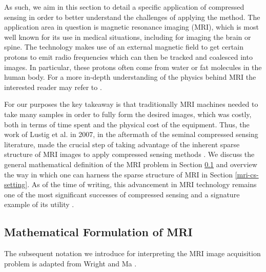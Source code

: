 \documentclass[12pt,a4paper]{amsart}
\numberwithin{equation}{section}
\theoremstyle{plain}
\theoremstyle{definition}
\begin{document}
As such, we aim in this section to detail a specific application of compressed sensing in order to better understand the challenges of applying the method. The application area in question is magnetic resonance imaging (MRI), which is most well known for its use in medical situations, including for imaging the brain or spine. The technology makes use of an external magnetic field to get certain protons to emit radio frequencies which can then be tracked and coalesced into images. In particular, these protons often come from water or fat molecules in the human body. For a more in-depth understanding of the physics behind MRI the interested reader may refer to \cite{wm}.

For our purposes the key takeaway is that traditionally MRI machines needed to take many samples in order to fully form the desired images, which was costly, both in terms of time spent and the physical cost of the equipment. Thus, the work of Lustig et al. in 2007, in the aftermath of the seminal compressed sensing literature, made the crucial step of taking advantage of the inherent sparse structure of MRI images to apply compressed sensing methods \cite{lustig}. We discuss the general mathematical definition of the MRI problem in Section \ref{mri-math} and overview the way in which one can harness the sparse structure of MRI in Section \ref{mri-cs-setting}. As of the time of writing, this advancement in MRI technology remains one of the most significant successes of compressed sensing and a signature example of its utility \cite{wm}.

\subsection{Mathematical Formulation of MRI}\label{mri-math}

The subsequent notation we introduce for interpreting the MRI image acquisition problem is adapted from Wright and Ma \cite{wm}.
\end{document}

